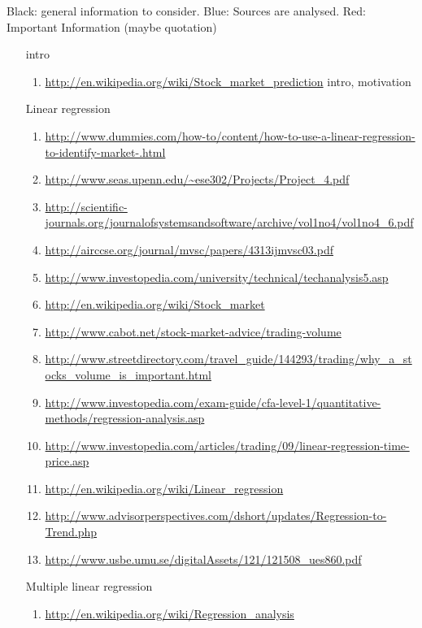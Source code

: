 \documentclass{article}
\begin{document}
Black: general information to consider. Blue: Sources are analysed. Red: Important Information (maybe quotation)
\begin{enumerate}
	\item[intro]
		\begin{enumerate}
			\item \textcolor{red}{\url{http://en.wikipedia.org/wiki/Stock_market_prediction}} intro, motivation
		\end{enumerate}
	\item[Linear regression]
		\begin{enumerate}
			\item \textcolor{blue}{\url{http://www.dummies.com/how-to/content/how-to-use-a-linear-regression-to-identify-market-.html}}
			\item \textcolor{blue}{\url{http://www.seas.upenn.edu/~ese302/Projects/Project_4.pdf}}
			\item \url{http://scientific-journals.org/journalofsystemsandsoftware/archive/vol1no4/vol1no4_6.pdf}
			\item \textcolor{red}{\url{http://airccse.org/journal/mvsc/papers/4313ijmvsc03.pdf}}
			\item \url{http://www.investopedia.com/university/technical/techanalysis5.asp}
			\item \url{http://en.wikipedia.org/wiki/Stock_market}
			\item \url{http://www.cabot.net/stock-market-advice/trading-volume}
			\item \url{http://www.streetdirectory.com/travel_guide/144293/trading/why_a_stocks_volume_is_important.html}
			\item \textcolor{red}{\url{http://www.investopedia.com/exam-guide/cfa-level-1/quantitative-methods/regression-analysis.asp}}
			\item \textcolor{red}{\url{http://www.investopedia.com/articles/trading/09/linear-regression-time-price.asp}}
			\item \textcolor{red}{\url{http://en.wikipedia.org/wiki/Linear_regression}}
			\item \textcolor{blue}{\url{http://www.advisorperspectives.com/dshort/updates/Regression-to-Trend.php}}
			\item \textcolor{blue}{\url{http://www.usbe.umu.se/digitalAssets/121/121508_ues860.pdf}}
		\end{enumerate}
	\item[Multiple linear regression]
		\begin{enumerate}
			\item \textcolor{blue}{\url{http://en.wikipedia.org/wiki/Regression_analysis}}

\end{enumerate}
\end{enumerate}
\end{document}

